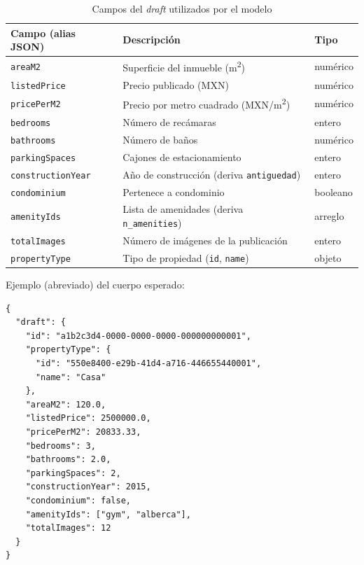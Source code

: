 \begin{table}[H]
  \centering
  \caption{Campos del \textit{draft} utilizados por el modelo}
  \label{tab:campos_entrada}
  \small
  \begin{tabularx}{\textwidth}{@{}lXl@{}}
    \toprule
    Campo (alias JSON) & Descripción & Tipo \\
    \midrule
    \texttt{areaM2}           & Superficie del inmueble (m\textsuperscript{2}) & numérico \\
    \texttt{listedPrice}      & Precio publicado (MXN)                          & numérico \\
    \texttt{pricePerM2}       & Precio por metro cuadrado (MXN/m\textsuperscript{2}) & numérico \\
    \texttt{bedrooms}         & Número de recámaras                             & entero \\
    \texttt{bathrooms}        & Número de baños                                 & numérico \\
    \texttt{parkingSpaces}    & Cajones de estacionamiento                     & entero \\
    \texttt{constructionYear} & Año de construcción (deriva \texttt{antiguedad}) & entero \\
    \texttt{condominium}      & Pertenece a condominio                          & booleano \\
    \texttt{amenityIds}       & Lista de amenidades (deriva \texttt{n\_amenities}) & arreglo \\
    \texttt{totalImages}      & Número de imágenes de la publicación            & entero \\
    \texttt{propertyType}     & Tipo de propiedad (\texttt{id}, \texttt{name})  & objeto \\
    \bottomrule
  \end{tabularx}
\end{table}

Ejemplo (abreviado) del cuerpo esperado:

\begin{lstlisting}[style=jsonstyle]
{
  "draft": {
    "id": "a1b2c3d4-0000-0000-0000-000000000001",
    "propertyType": {
      "id": "550e8400-e29b-41d4-a716-446655440001",
      "name": "Casa"
    },
    "areaM2": 120.0,
    "listedPrice": 2500000.0,
    "pricePerM2": 20833.33,
    "bedrooms": 3,
    "bathrooms": 2.0,
    "parkingSpaces": 2,
    "constructionYear": 2015,
    "condominium": false,
    "amenityIds": ["gym", "alberca"],
    "totalImages": 12
  }
}
\end{lstlisting}

